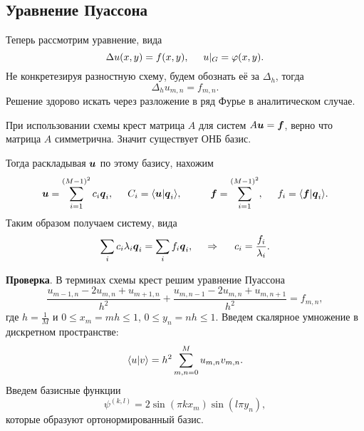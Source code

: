 \subsection*{Уравнение Пуассона}

Теперь рассмотрим уравнение, вида
\begin{equation*}
	\Delta u(x, y) = f(x, y),
	\hspace{5 mm} 
	u|_G = \varphi(x, y).
\end{equation*}
Не конкретезируя разностную схему, будем обознать её за $\Delta_h$, тогда
\begin{equation*}
	\Delta_h u_{m,n} = f_{m,n}.
\end{equation*}
Решение здорово искать через разложение в ряд Фурье в аналитическом случае. 

При использовании схемы крест матрица $A$ для систем $A \mbox{\boldmath $u$} = \mbox{\boldmath $f$}$, верно что матрица $A$ симметрична. Значит существует ОНБ базис. 

Тогда раскладывая $\mbox{\boldmath $u$}$ по этому базису, нахожим
\begin{equation*}
	\vc{u} = \sum_{i=1}^{(M-1)^2}  c_i \vc{q}_i,
	\hspace{5 mm} 
	C_i = \bk{\vc{u}}{\vc{q}_i},
	\hspace{10 mm} 
	\vc{f} = \sum_{i=1}^{(M-1)^2},
	\hspace{5 mm} 
	f_i = \bk{\vc{f}}{\vc{q}_i}.
\end{equation*}
Таким образом получаем систему, вида
\begin{equation*}
	\sum_i c_i \lambda_i \mbox{\boldmath $q$}_i = \sum_i f_i \mbox{\boldmath $q$}_i,
	\hspace{0.5cm} \Rightarrow \hspace{0.5cm}
	c_i = \frac{f_i}{\lambda_i}.
\end{equation*}



\textbf{Проверка}. В терминах схемы крест решим уравнение Пуассона
\begin{equation*}
	\frac{u_{m-1,n} - 2 u_{m,n} + u_{m+1, n}}{h^2} + \frac{u_{m,n-1} - 2 u_{m,n} + u_{m, n+1}}{h^2} = f_{m,n},
\end{equation*}
где $h = \frac{1}{M}$ и $0 \leq x_m = m h \leq 1$, $0 \leq y_n = nh \leq 1$. Введем скалярное умножение в дискретном пространстве:
\begin{equation*}
	\bk{u}{v} = h^2 \sum_{m, n=0}^{M} u_{m,n} v_{m,n}.
\end{equation*}
Введем базисные функции
\begin{equation*}
	\psi^{(k,l)} = 2 \sin(\pi k x_m) \sin(l \pi y_n),
\end{equation*}
которые образуют ортонормированный базис. 

